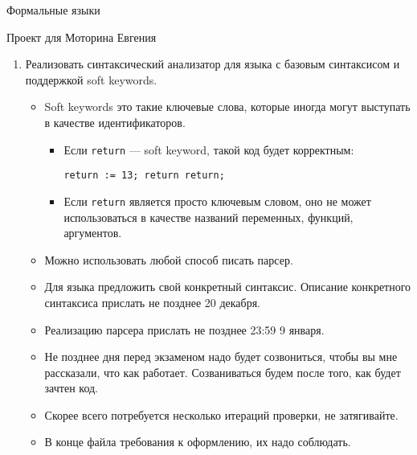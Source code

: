 \documentclass[12pt]{article}
\begin{document}
\begin{center}
{\LARGE Формальные языки}

{\Large Проект для Моторина Евгения}

\end{center}

\bigskip

\begin{enumerate}
  \item {Реализовать синтаксический анализатор для языка с базовым синтаксисом и поддержкой soft keywords. }
  \begin{itemize}
    \item Soft keywords это такие ключевые слова, которые иногда могут выступать в качестве идентификаторов.
    \begin{itemize}
      \item Если \verb!return! --- soft keyword, такой код будет корректным:

      \verb!return := 13; return return;!
      \item Если \verb!return! является просто ключевым словом, оно не может использоваться в качестве названий переменных, функций, аргументов.
    \end{itemize}
    \item Можно использовать любой способ писать парсер.
    \item Для языка предложить свой конкретный синтаксис. Описание конкретного синтаксиса прислать не позднее 20 декабря.
    \item Реализацию парсера прислать не позднее 23:59 9 января.
    \item Не позднее дня перед экзаменом надо будет созвониться, чтобы вы мне рассказали, что как работает. Созваниваться будем после того, как будет зачтен код.
    \item Скорее всего потребуется несколько итераций проверки, не затягивайте.
    \item В конце файла требования к оформлению, их надо соблюдать.
  \end{itemize}

\end{enumerate}



\bigskip


\end{document}
